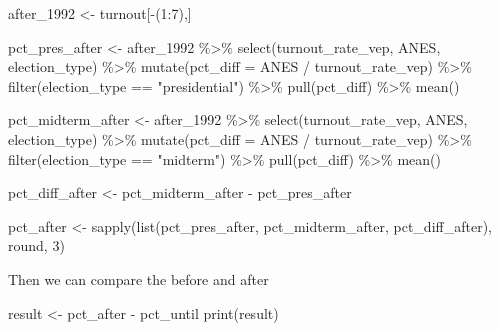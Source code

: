 \documentclass[
  letterpaper,
  DIV=11,
  numbers=noendperiod]{scrartcl}
\newenvironment{Shaded}{\begin{snugshade}}{\end{snugshade}}
\newcommand{\AttributeTok}[1]{\textcolor[rgb]{0.40,0.45,0.13}{#1}}
\newcommand{\DecValTok}[1]{\textcolor[rgb]{0.68,0.00,0.00}{#1}}
\newcommand{\FunctionTok}[1]{\textcolor[rgb]{0.28,0.35,0.67}{#1}}
\newcommand{\NormalTok}[1]{\textcolor[rgb]{0.00,0.23,0.31}{#1}}
\newcommand{\OtherTok}[1]{\textcolor[rgb]{0.00,0.23,0.31}{#1}}
\newcommand{\SpecialCharTok}[1]{\textcolor[rgb]{0.37,0.37,0.37}{#1}}
\newcommand{\StringTok}[1]{\textcolor[rgb]{0.13,0.47,0.30}{#1}}
\begin{document}
\begin{Shaded}
\begin{Highlighting}[]
\NormalTok{after\_1992 }\OtherTok{\textless{}{-}}\NormalTok{ turnout[}\SpecialCharTok{{-}}\NormalTok{(}\DecValTok{1}\SpecialCharTok{:}\DecValTok{7}\NormalTok{),]}

\NormalTok{pct\_pres\_after }\OtherTok{\textless{}{-}}\NormalTok{ after\_1992 }\SpecialCharTok{\%\textgreater{}\%} 
  \FunctionTok{select}\NormalTok{(turnout\_rate\_vep, ANES, election\_type) }\SpecialCharTok{\%\textgreater{}\%} 
  \FunctionTok{mutate}\NormalTok{(}\AttributeTok{pct\_diff =}\NormalTok{ ANES }\SpecialCharTok{/}\NormalTok{ turnout\_rate\_vep) }\SpecialCharTok{\%\textgreater{}\%} 
  \FunctionTok{filter}\NormalTok{(election\_type }\SpecialCharTok{==} \StringTok{"presidential"}\NormalTok{) }\SpecialCharTok{\%\textgreater{}\%} 
  \FunctionTok{pull}\NormalTok{(pct\_diff) }\SpecialCharTok{\%\textgreater{}\%} 
  \FunctionTok{mean}\NormalTok{()}

\NormalTok{pct\_midterm\_after }\OtherTok{\textless{}{-}}\NormalTok{ after\_1992 }\SpecialCharTok{\%\textgreater{}\%} 
  \FunctionTok{select}\NormalTok{(turnout\_rate\_vep, ANES, election\_type) }\SpecialCharTok{\%\textgreater{}\%} 
  \FunctionTok{mutate}\NormalTok{(}\AttributeTok{pct\_diff =}\NormalTok{ ANES }\SpecialCharTok{/}\NormalTok{ turnout\_rate\_vep) }\SpecialCharTok{\%\textgreater{}\%} 
  \FunctionTok{filter}\NormalTok{(election\_type }\SpecialCharTok{==} \StringTok{"midterm"}\NormalTok{) }\SpecialCharTok{\%\textgreater{}\%} 
  \FunctionTok{pull}\NormalTok{(pct\_diff) }\SpecialCharTok{\%\textgreater{}\%} 
  \FunctionTok{mean}\NormalTok{()}

\NormalTok{pct\_diff\_after }\OtherTok{\textless{}{-}}\NormalTok{ pct\_midterm\_after }\SpecialCharTok{{-}}\NormalTok{ pct\_pres\_after}

\NormalTok{pct\_after }\OtherTok{\textless{}{-}} \FunctionTok{sapply}\NormalTok{(}\FunctionTok{list}\NormalTok{(pct\_pres\_after, pct\_midterm\_after, pct\_diff\_after), round, }\DecValTok{3}\NormalTok{)}
\end{Highlighting}
\end{Shaded}

Then we can compare the before and after

\begin{Shaded}
\begin{Highlighting}[]
\NormalTok{result }\OtherTok{\textless{}{-}}\NormalTok{ pct\_after }\SpecialCharTok{{-}}\NormalTok{ pct\_until}
\FunctionTok{print}\NormalTok{(result)}
\end{Highlighting}
\end{Shaded}
\end{document}
